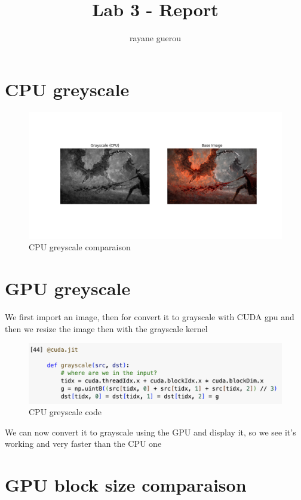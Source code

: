 \documentclass[a4paper]{article}
\title{Lab 3 - Report}
\author{rayane guerou}
\begin{document}
\maketitle

\section{CPU greyscale}

\begin{figure}[h!]
\centering
\includegraphics[scale=0.4]{src/grayscale_cpu.png}
\caption{CPU greyscale comparaison}
\end{figure}
\vspace{1cm}

\section{GPU greyscale}
We first import an image, then for convert it to grayscale with CUDA gpu and then we resize the image then with the grayscale kernel 

\begin{figure}[h!]
\centering
\includegraphics[scale=0.5]{src/grayscale.png}
\caption{CPU greyscale code}
\end{figure}

We can now convert it to grayscale using the GPU and display it, so we see it's working and very faster than the CPU one
\vspace{5cm}
\section{GPU block size comparaison}
\end{document}
